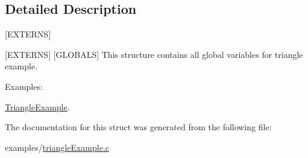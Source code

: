 \subsection{Detailed Description}
\mbox{[}E\-X\-T\-E\-R\-N\-S\mbox{]} 

\mbox{[}E\-X\-T\-E\-R\-N\-S\mbox{]} \mbox{[}G\-L\-O\-B\-A\-L\-S\mbox{]} This structure contains all global variables for triangle example. \begin{Desc}
\item[Examples\-: ]\par
\hyperlink{TriangleExample-example}{Triangle\-Example}.\end{Desc}


The documentation for this struct was generated from the following file\-:\begin{DoxyCompactItemize}
\item 
examples/\hyperlink{triangleExample_8c}{triangle\-Example.\-c}\end{DoxyCompactItemize}
